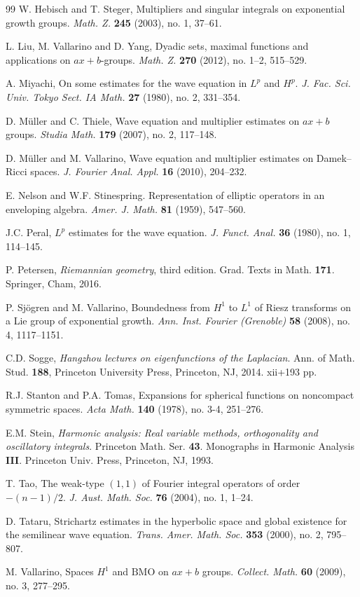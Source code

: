 \documentclass[a4paper,12pt]{amsart}
\numberwithin{equation}{section}
\theoremstyle{definition}
\theoremstyle{remark}
\numberwithin{theorem}{section}
\newcommand{\BMO}{\mathrm{BMO}}
\begin{document}
\begin{thebibliography}{99}
W. Hebisch and T. Steger, Multipliers and singular integrals on exponential growth groups. \textit{Math. Z.} \textbf{245} (2003), no. 1, 37--61.

L. Liu, M. Vallarino and D. Yang, Dyadic sets, maximal functions and applications on $ax+b$-groups. \textit{Math. Z.} \textbf{270} (2012), no. 1--2, 515--529.

A. Miyachi, On some estimates for the wave equation in $L^p$ and $H^p$. \textit{J. Fac. Sci. Univ. Tokyo Sect. IA Math.} \textbf{27} (1980), no. 2, 331--354.

D. M\"{u}ller and C. Thiele, Wave equation and multiplier estimates on $ax+b$ groups. \textit{Studia Math.} \textbf{179} (2007), no. 2, 117--148.

D. M\"{u}ller and M. Vallarino, Wave equation and multiplier estimates on Damek--Ricci spaces. \textit{J. Fourier Anal. Appl.} \textbf{16} (2010), 204--232.

E. Nelson and W.F. Stinespring. Representation of elliptic operators in an enveloping algebra. \textit{Amer. J. Math.} \textbf{81} (1959), 547--560.

J.C. Peral, $L^p$ estimates for the wave equation. \textit{J. Funct. Anal.} \textbf{36} (1980), no. 1, 114--145.

P. Petersen, \textit{Riemannian geometry}, third edition. Grad. Texts in Math. \textbf{171}. Springer, Cham, 2016.

P. Sj\"ogren and M. Vallarino, Boundedness from $H^1$ to $L^1$ of Riesz transforms on a Lie group of exponential growth. \textit{Ann. Inst. Fourier (Grenoble)} \textbf{58} (2008), no. 4, 1117--1151.

C.D. Sogge, \textit{Hangzhou lectures on eigenfunctions of the Laplacian}. Ann. of Math. Stud. \textbf{188}, Princeton University Press, Princeton, NJ, 2014. xii+193 pp.

R.J. Stanton and P.A. Tomas, Expansions for spherical functions on noncompact symmetric spaces. \textit{Acta Math.} \textbf{140} (1978), no. 3-4, 251--276.

E.M. Stein, \textit{Harmonic analysis: Real variable methods, orthogonality and oscillatory integrals}. Princeton Math. Ser. \textbf{43}. Monographs in Harmonic Analysis \textbf{III}. Princeton Univ. Press, Princeton, NJ, 1993.

T. Tao, The weak-type $(1,1)$ of Fourier integral operators of order $-(n-1)/2$. \textit{J. Aust. Math. Soc.} \textbf{76} (2004), no. 1, 1--24. 

D. Tataru, Strichartz estimates in the hyperbolic space and global existence for the semilinear wave equation. \textit{Trans. Amer. Math. Soc.} \textbf{353} (2000), no. 2, 795--807.

M. Vallarino, Spaces $H^1$ and $\BMO$ on $ax+b$ groups. \textit{Collect. Math.} \textbf{60} (2009), no. 3, 277--295.
\end{thebibliography}
\end{document}
